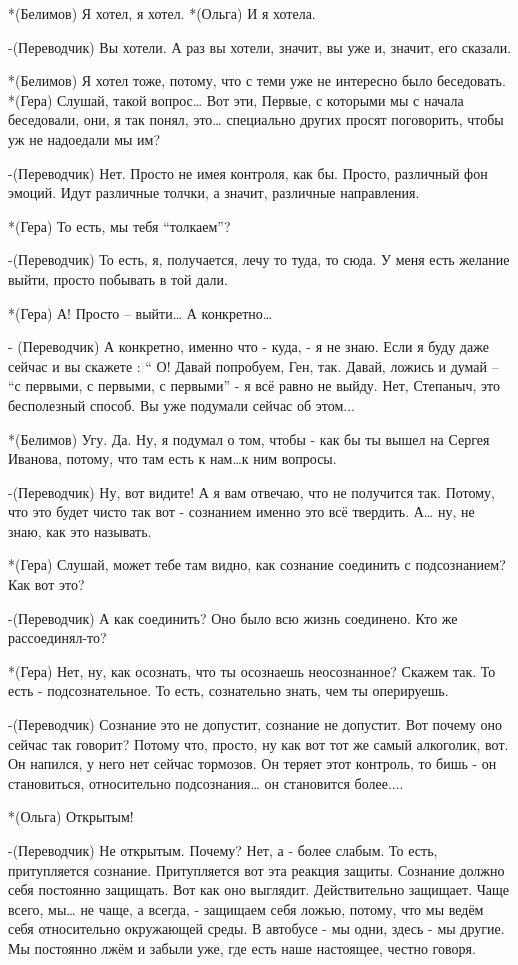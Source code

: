 *(Белимов) Я хотел, я хотел.
*(Ольга) И я хотела.

-(Переводчик) Вы хотели. А раз вы хотели, значит, вы уже и, значит, его сказали.

*(Белимов) Я хотел тоже, потому, что с теми уже не интересно было беседовать.
*(Гера) Слушай, такой вопрос… Вот эти, Первые, с которыми мы с начала беседовали, они, я так понял, это… специально других просят поговорить, чтобы уж не надоедали мы им?

-(Переводчик) Нет. Просто не имея контроля, как бы. Просто, различный фон эмоций. Идут различные толчки, а значит, различные направления.

*(Гера) То есть, мы тебя “толкаем”?

-(Переводчик) То есть, я, получается, лечу то туда, то сюда. У меня есть желание выйти, просто побывать в той дали.

*(Гера) А! Просто – выйти… А конкретно…

 - (Переводчик) А конкретно, именно что -  куда, - я не знаю. Если я буду даже сейчас  и вы скажете : “ О! Давай попробуем, Ген, так. Давай, ложись и думай – “с первыми, с первыми, с первыми” - я всё равно не выйду. Нет, Степаныч, это бесполезный способ.  Вы уже подумали сейчас об этом... 

*(Белимов) Угу. Да. Ну, я подумал о том, чтобы - как бы ты вышел на Сергея Иванова, потому, что там есть к нам…к ним вопросы. 

-(Переводчик) Ну, вот видите! А я вам отвечаю, что не получится так. Потому, что это будет чисто так вот - сознанием именно это всё твердить. А… ну, не знаю, как это называть.

*(Гера) Слушай, может тебе там видно, как сознание соединить с подсознанием? Как вот это?

-(Переводчик) А как соединить? Оно было всю жизнь соединено. Кто же рассоединял-то?

*(Гера) Нет, ну, как осознать, что ты осознаешь неосознанное? Скажем так. То есть - подсознательное. То есть, сознательно знать, чем ты оперируешь. 

-(Переводчик) Сознание это не допустит, сознание не допустит. Вот почему оно сейчас так говорит? Потому что, просто, ну как вот тот же самый алкоголик, вот.  Он напился, у него нет сейчас тормозов. Он теряет этот контроль, то бишь -  он становиться, относительно подсознания… он становится более....

*(Ольга) Открытым!

-(Переводчик) Не открытым. Почему? Нет, а - более слабым. То есть, притупляется сознание. Притупляется вот эта реакция защиты. Сознание должно себя постоянно защищать. Вот как оно выглядит. Действительно защищает. Чаще всего, мы… не чаще, а всегда, - защищаем себя ложью, потому, что мы ведём себя относительно окружающей среды. В автобусе - мы одни, здесь - мы другие. Мы постоянно лжём и забыли уже, где есть наше настоящее, честно говоря.

